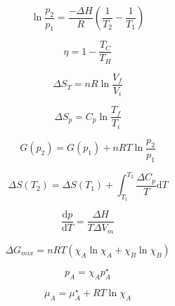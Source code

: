 \documentclass[12pt, letterpaper]{memoir}
\begin{document}
\begin{equation*}
	\ln\dfrac{p_2}{p_1}=\dfrac{-\Delta H}{R}\left(\dfrac{1}{T_2}-\dfrac{1}{T_1}\right)
\end{equation*}

\noindent
\begin{minipage}[t]{0.5\linewidth}	

	
	\begin{equation*}
		\eta = 1 - \dfrac{T_C}{T_H}
	\end{equation*}	
	
	\begin{equation*}
		\Delta S_T=nR\ln\dfrac{V_f}{V_i}
	\end{equation*}	
	
	\begin{equation*}
		\Delta S_p=C_p\ln\dfrac{T_f}{T_i}
	\end{equation*}	
	
	\begin{equation*}
		G(p_2) = G(p_1)+nRT\ln\dfrac{p_2}{p_1}
	\end{equation*}
	
	\begin{equation*}
		\Delta S(T_2) = \Delta S(T_1) + \int_{T_1}^{T_2} \! \dfrac{\Delta C_{p}}{T}\mathrm{d}T
	\end{equation*}
	
	\begin{equation*}
		\dfrac{\mathrm{d}p}{\mathrm{d}T}=\dfrac{\Delta H}{T\Delta V_m}
	\end{equation*}

	\begin{equation*}
		\Delta G_{mix} = nRT\left(\chi_A\ln\chi_A+\chi_B\ln\chi_B\right)
	\end{equation*}
	
	\begin{equation*}
		p_A=\chi_Ap^{\star}_A
	\end{equation*}
	
	\begin{equation*}
		\mu_A=\mu_A^{\star}+RT\ln\chi_A
	\end{equation*}
	
	
	
\end{minipage}
\end{document}
